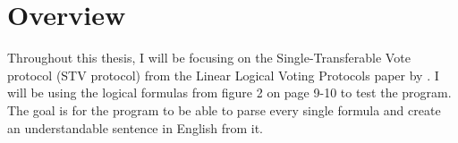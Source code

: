 \chapter{Overview}
\label{02}

Throughout this thesis, I will be focusing on the Single-Transferable Vote protocol (STV protocol) from the Linear Logical Voting Protocols\cite{Deyoung11} paper by \citeauthor{Deyoung11}. I will be using the logical formulas from figure 2 on page 9-10 to test the program. The goal is for the program to be able to parse every single formula and create an understandable sentence in English from it.

